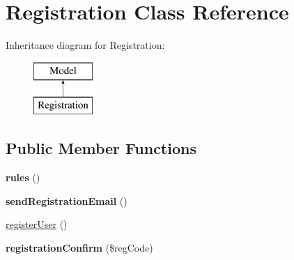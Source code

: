 \hypertarget{classapp_1_1models_1_1_registration}{}\section{Registration Class Reference}
\label{classapp_1_1models_1_1_registration}
Inheritance diagram for Registration\+:\begin{figure}[H]
\begin{center}
\leavevmode
\includegraphics[height=2.000000cm]{classapp_1_1models_1_1_registration}
\end{center}
\end{figure}
\subsection*{Public Member Functions}
\begin{DoxyCompactItemize}
\item 
\hypertarget{classapp_1_1models_1_1_registration_a17dba92d96b9dd48c62f3ede3eef94d4}{}\label{classapp_1_1models_1_1_registration_a17dba92d96b9dd48c62f3ede3eef94d4} 
{\bfseries rules} ()
\item 
\hypertarget{classapp_1_1models_1_1_registration_a69ad61100b396854a498f1691c71bea6}{}\label{classapp_1_1models_1_1_registration_a69ad61100b396854a498f1691c71bea6} 
{\bfseries send\+Registration\+Email} ()
\item 
\hyperlink{classapp_1_1models_1_1_registration_a1fdb0f05b888f4aa92b319775e488e70}{register\+User} ()
\item 
\hypertarget{classapp_1_1models_1_1_registration_a7e2a269af301c25aa204dc5fd296ab89}{}\label{classapp_1_1models_1_1_registration_a7e2a269af301c25aa204dc5fd296ab89} 
{\bfseries registration\+Confirm} (\$reg\+Code)
\end{DoxyCompactItemize}
